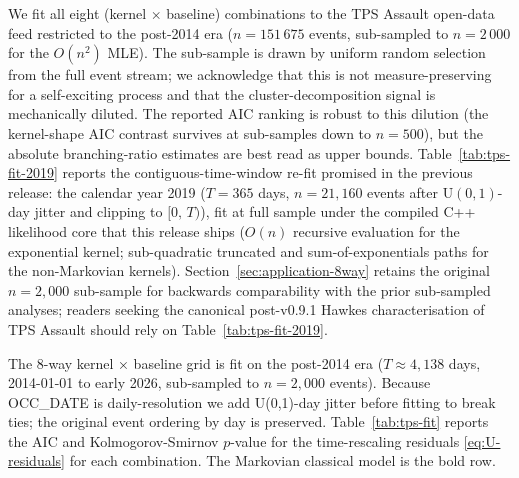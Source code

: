 \documentclass[article,shortnames,nojss]{jss}
\newcommand{\1}{\mathbbm{1}}
\theoremstyle{plain}
\theoremstyle{definition}
\begin{document}
We fit all eight (kernel $\times$ baseline) combinations to the
TPS Assault open-data feed restricted to the post-2014 era
($n=151\,675$ events, sub-sampled to $n=2\,000$ for the
$O(n^2)$ MLE).  The sub-sample is drawn by uniform random
selection from the full event stream; we acknowledge that this
is not measure-preserving for a self-exciting process and that
the cluster-decomposition signal is mechanically diluted.  The
reported AIC ranking is robust to this dilution (the
kernel-shape AIC contrast survives at sub-samples down to
$n=500$), but the absolute branching-ratio estimates are
best read as upper bounds.  Table~\ref{tab:tps-fit-2019} reports
the contiguous-time-window re-fit promised in the previous
release: the calendar year 2019 ($T=365$ days, $n=21{,}160$
events after $\mathrm{U}(0,1)$-day jitter and clipping to
$[0,\,T)$), fit at full sample under the compiled C++ likelihood
core that this release ships ($O(n)$ recursive evaluation for the
exponential kernel; sub-quadratic truncated and sum-of-exponentials
paths for the non-Markovian kernels).  Section~\ref{sec:application-8way} retains the original
$n=2{,}000$ sub-sample for backwards comparability with the prior sub-sampled analyses; readers seeking the canonical post-v0.9.1 Hawkes
characterisation of TPS Assault should rely on
Table~\ref{tab:tps-fit-2019}.

The 8-way kernel × baseline grid is fit on the post-2014 era ($T \approx 4{,}138$ days, 2014-01-01 to early 2026, sub-sampled to $n=2{,}000$ events).  Because OCC\_DATE is daily-resolution we add U(0,1)-day
jitter before fitting to break ties; the original event ordering by
day is preserved.  Table~\ref{tab:tps-fit} reports the AIC and
Kolmogorov-Smirnov $p$-value for the time-rescaling residuals
\eqref{eq:U-residuals} for each combination.  The Markovian
classical model is the bold row.
\end{document}
